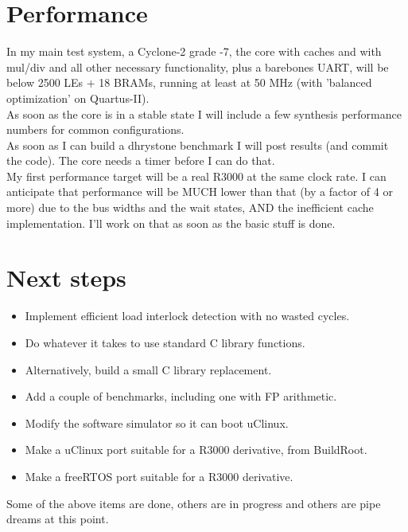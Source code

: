 \section{Performance}
\label{performance}
    In my main test system, a Cyclone-2 grade -7, the core
    with caches and with mul/div and all other necessary functionality, plus 
    a barebones UART, will be below 2500 LEs + 18 BRAMs, running at least at 
    50 MHz (with 'balanced optimization' on Quartus-II).\\
    
    As soon as the core is in a stable state I will include a few synthesis
    performance numbers for common configurations.\\

    As soon as I can build a dhrystone benchmark I will post results (and commit
    the code). The core needs a timer before I can do that.\\
    
    My first performance target will be a real R3000 at the same clock rate.
    I can anticipate that performance will be MUCH lower than that (by a factor 
    of 4 or more) due to the bus widths and the wait states, AND the inefficient
    cache implementation. I'll work on that as soon as the basic stuff is done.
   
\section{Next steps}
\label{next_steps}
    \begin{itemize}
    \item Implement efficient load interlock detection with no wasted cycles.
    \item Do whatever it takes to use standard C library functions.
    \item Alternatively, build a small C library replacement.
    \item Add a couple of benchmarks, including one with FP arithmetic.
    \item Modify the software simulator so it can boot uClinux.
    \item Make a uClinux port suitable for a R3000 derivative, from BuildRoot.
    \item Make a freeRTOS port suitable for a R3000 derivative.
    \end{itemize}

    Some of the above items are done, others are in progress and others
    are pipe dreams at this point.
    